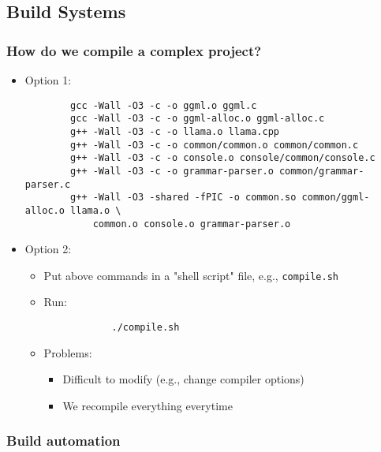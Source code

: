 \documentclass[12pt]{article}
\begin{document}
\subsection{Build Systems}

\subsubsection{How do we compile a complex project?}

\begin{itemize}
    \item Option 1:
    \begin{verbatim}
        gcc -Wall -O3 -c -o ggml.o ggml.c
        gcc -Wall -O3 -c -o ggml-alloc.o ggml-alloc.c
        g++ -Wall -O3 -c -o llama.o llama.cpp
        g++ -Wall -O3 -c -o common/common.o common/common.c
        g++ -Wall -O3 -c -o console.o console/common/console.c
        g++ -Wall -O3 -c -o grammar-parser.o common/grammar-parser.c
        g++ -Wall -O3 -shared -fPIC -o common.so common/ggml-alloc.o llama.o \
            common.o console.o grammar-parser.o
    \end{verbatim}
    
    \item Option 2:
    \begin{itemize}
        \item Put above commands in a "shell script" file, e.g., \texttt{compile.sh}
        
        \item Run:
        \begin{verbatim}
            ./compile.sh
        \end{verbatim}
        
        \item Problems:
        \begin{itemize}
            \item Difficult to modify (e.g., change compiler options)
            \item We recompile everything everytime
        \end{itemize}
    \end{itemize}
\end{itemize}

\subsubsection{Build automation}
\end{document}
